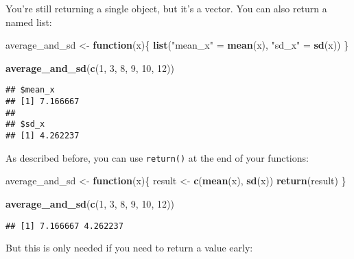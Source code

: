 \documentclass[
]{article}
\newenvironment{Shaded}{\begin{snugshade}}{\end{snugshade}}
\newcommand{\ControlFlowTok}[1]{\textcolor[rgb]{0.13,0.29,0.53}{\textbf{#1}}}
\newcommand{\DecValTok}[1]{\textcolor[rgb]{0.00,0.00,0.81}{#1}}
\newcommand{\KeywordTok}[1]{\textcolor[rgb]{0.13,0.29,0.53}{\textbf{#1}}}
\newcommand{\NormalTok}[1]{#1}
\newcommand{\StringTok}[1]{\textcolor[rgb]{0.31,0.60,0.02}{#1}}
\begin{document}
You're still returning a single object, but it's a vector. You can also return a named list:

\begin{Shaded}
\begin{Highlighting}[]
\NormalTok{average\_and\_sd \textless{}{-}}\StringTok{ }\ControlFlowTok{function}\NormalTok{(x)\{}
\KeywordTok{list}\NormalTok{(}\StringTok{"mean\_x"}\NormalTok{ =}\StringTok{  }\KeywordTok{mean}\NormalTok{(x), }\StringTok{"sd\_x"}\NormalTok{ =}\StringTok{ }\KeywordTok{sd}\NormalTok{(x))}
\NormalTok{\}}

\KeywordTok{average\_and\_sd}\NormalTok{(}\KeywordTok{c}\NormalTok{(}\DecValTok{1}\NormalTok{, }\DecValTok{3}\NormalTok{, }\DecValTok{8}\NormalTok{, }\DecValTok{9}\NormalTok{, }\DecValTok{10}\NormalTok{, }\DecValTok{12}\NormalTok{))}
\end{Highlighting}
\end{Shaded}

\begin{verbatim}
## $mean_x
## [1] 7.166667
## 
## $sd_x
## [1] 4.262237
\end{verbatim}

As described before, you can use \texttt{return()} at the end of your functions:

\begin{Shaded}
\begin{Highlighting}[]
\NormalTok{average\_and\_sd \textless{}{-}}\StringTok{ }\ControlFlowTok{function}\NormalTok{(x)\{}
\NormalTok{  result \textless{}{-}}\StringTok{ }\KeywordTok{c}\NormalTok{(}\KeywordTok{mean}\NormalTok{(x), }\KeywordTok{sd}\NormalTok{(x))}
\KeywordTok{return}\NormalTok{(result)}
\NormalTok{\}}

\KeywordTok{average\_and\_sd}\NormalTok{(}\KeywordTok{c}\NormalTok{(}\DecValTok{1}\NormalTok{, }\DecValTok{3}\NormalTok{, }\DecValTok{8}\NormalTok{, }\DecValTok{9}\NormalTok{, }\DecValTok{10}\NormalTok{, }\DecValTok{12}\NormalTok{))}
\end{Highlighting}
\end{Shaded}

\begin{verbatim}
## [1] 7.166667 4.262237
\end{verbatim}

But this is only needed if you need to return a value early:
\end{document}
